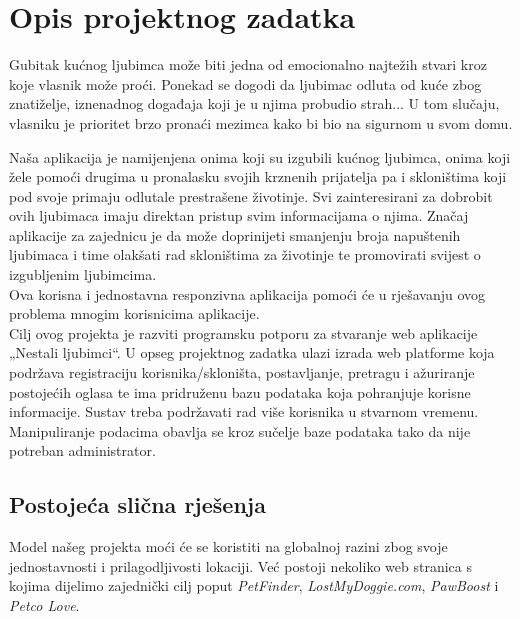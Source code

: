 \chapter{Opis projektnog zadatka}

		Gubitak kućnog ljubimca može biti jedna od emocionalno najtežih stvari kroz koje vlasnik može proći. Ponekad se dogodi da ljubimac odluta od kuće zbog znatiželje, iznenadnog događaja koji je u njima probudio strah... U tom slučaju, vlasniku je prioritet brzo pronaći mezimca kako bi bio na sigurnom u svom domu.
		
		Naša aplikacija je namijenjena onima koji su izgubili kućnog ljubimca, onima koji žele pomoći drugima u pronalasku svojih krznenih prijatelja pa i skloništima koji pod svoje primaju odlutale prestrašene životinje. Svi zainteresirani za dobrobit ovih ljubimaca imaju direktan pristup svim informacijama o njima. Značaj aplikacije za zajednicu je da može doprinijeti smanjenju broja napuštenih ljubimaca i time olakšati rad skloništima za životinje te promovirati svijest o izgubljenim ljubimcima. \\
		
		Ova korisna i jednostavna responzivna aplikacija pomoći će u rješavanju ovog problema mnogim korisnicima aplikacije.\\
		
		Cilj ovog projekta je razviti programsku potporu za stvaranje web aplikacije „Nestali ljubimci“. U opseg projektnog zadatka ulazi izrada web platforme koja podržava registraciju korisnika/skloništa, postavljanje, pretragu i ažuriranje postojećih oglasa te ima pridruženu bazu podataka koja pohranjuje korisne informacije. Sustav treba podržavati rad više korisnika u stvarnom vremenu. Manipuliranje podacima obavlja se kroz sučelje baze podataka tako da nije potreban administrator.
		
		\eject
		
		\section{Postojeća slična rješenja}
		
		Model našeg projekta moći će se koristiti na globalnoj razini zbog svoje jednostavnosti i prilagodljivosti lokaciji. Već postoji nekoliko web stranica s kojima dijelimo zajednički cilj poput \textit{PetFinder}, \textit{LostMyDoggie.com}, \textit{PawBoost} i \textit{Petco Love}.
		
